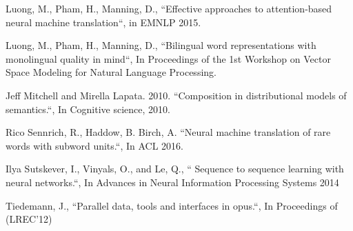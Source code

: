\documentclass[a4paper]{article}
\begin{document}
\begin{thebibliography}{30}
 Luong, M., Pham, H., Manning, D.,  ``Effective approaches to attention-based neural machine translation``, in EMNLP 2015.


Luong, M., Pham, H., Manning, D., ``Bilingual word representations with monolingual quality in mind``, In  Proceedings of the 1st Workshop on Vector Space Modeling for  Natural Language Processing. 


Jeff Mitchell and Mirella Lapata. 2010.
\newblock ``Composition in distributional models of semantics.``,
In Cognitive science, 2010.





Rico Sennrich, R.,  Haddow, B. Birch, A. ``Neural machine translation of rare words with subword units.``,
 In ACL 2016.


Ilya Sutskever, I.,  Vinyals, O.,  and Le, Q., `` Sequence to sequence learning with neural networks.``,
In  Advances in Neural Information Processing Systems 2014

Tiedemann, J., ``Parallel data, tools and interfaces in opus.``,  In  Proceedings of  (LREC'12) 


\end{thebibliography}
\end{document}
